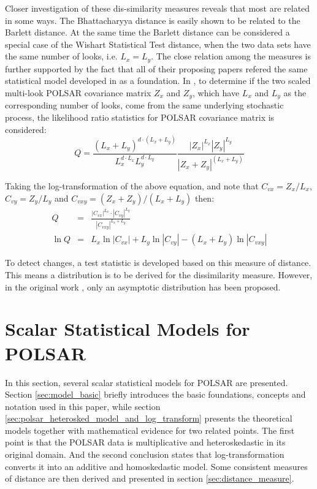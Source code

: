 \documentclass[journal,12pt,draftcls,onecolumn]{IEEEtran}
\begin{document}


Closer investigation of these dis-similarity measures reveals that most are related in some ways. %
The Bhattacharyya distance is easily shown to be related to the Barlett distance.
At the same time the Barlett distance can be considered a special case of the Wishart Statistical Test distance,
  when the two data sets have the same number of looks, i.e. $L_x=L_y$.
The close relation among the measures is further supported by the fact that
  all of their proposing papers refered the same statistical model developed in \cite{Conradsen_2003_TGRS_4} as a foundation.
In \cite{Conradsen_2003_TGRS_4}, to determine if the two scaled multi-look POLSAR covariance matrix $Z_x$ and $Z_y$,
  which have $L_x$ and $L_y$ as the corresponding number of looks,
  come from the same underlying stochastic process,
the likelihood ratio statistics for POLSAR covariance matrix is considered:  
\begin{equation*}
  Q = \frac{(L_x+L_y)^{d \cdot (L_x+L_y)}}{L_x^{d \cdot L_x} L_y^{d \cdot L_y}} \frac{|Z_x|^{L_x} |Z_y|^{L_y} }{|Z_x+Z_y|^{(L_x+L_y)}}
\end{equation*}

Taking the log-transformation of the above equation, and note that $C_{vx} = Z_x / L_x$, $C_{vy} = Z_y / L_y$ and $C_{vxy} = (Z_x + Z_y)/(L_x + L_y)$ then:
\begin{eqnarray}
  Q &=& \frac{|C_{vx}|^{L_x} \cdot |C_{vy}|^{L_y} }{|C_{vxy}|^{L_x + L_y}} \label{eqn:ori_likelyhood_stats} \\
  \ln Q &=& L_x \ln |C_{vx}| + L_y \ln |C_{vy}| - (L_x + L_y) \ln |C_{vxy}| \label{eqn:log_likelyhood_stats}
\end{eqnarray}

To detect changes, a test statistic is developed based on this measure of distance.
This means a distribution is to be derived for the dissimilarity measure.
However, in the original work \cite{Conradsen_2003_TGRS_4}, only an asymptotic distribution has been proposed.

\section{Scalar Statistical Models for POLSAR}  
\label{sec:theoretical_model}

In this section, several scalar statistical models for POLSAR are presented.
Section \ref{sec:model_basic} briefly introduces the basic foundations, concepts and notation used in this paper, %
  while section \ref{sec:polsar_heterosked_model_and_log_transform}
  presents the theoretical models together with mathematical evidence for two related points.
The first point is that the POLSAR data is multiplicative and heteroskedastic in its original domain.
And the second conclusion states that log-transformation converts it into an additive and homoskedastic model.
Some consistent measures of distance are then derived and presented in section \ref{sec:distance_measure}.
\end{document}
